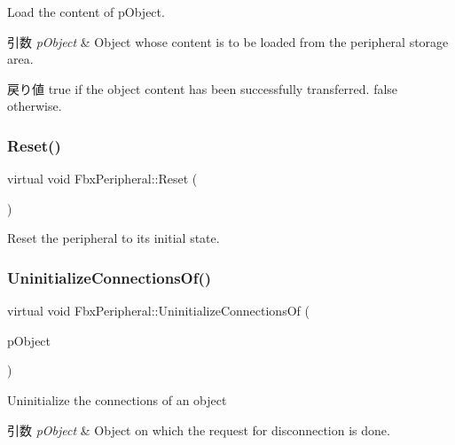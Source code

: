 Load the content of p\+Object. 
\begin{DoxyParams}{引数}
{\em p\+Object} & Object whose content is to be loaded from the peripheral storage area. \\
\hline
\end{DoxyParams}
\begin{DoxyReturn}{戻り値}
{\ttfamily true} if the object content has been successfully transferred. {\ttfamily false} otherwise. 
\end{DoxyReturn}
\mbox{\label{class_fbx_peripheral_abda49f57236244f342a37d3fb04b476b}} 
\subsubsection{\texorpdfstring{Reset()}{Reset()}}
{\footnotesize\ttfamily virtual void Fbx\+Peripheral\+::\+Reset (\begin{DoxyParamCaption}{ }\end{DoxyParamCaption})\hspace{0.3cm}{\ttfamily [pure virtual]}}

Reset the peripheral to its initial state. \mbox{\label{class_fbx_peripheral_ae7cd11b61456cfa33644ebf37870779c}} 
\subsubsection{\texorpdfstring{Uninitialize\+Connections\+Of()}{UninitializeConnectionsOf()}}
{\footnotesize\ttfamily virtual void Fbx\+Peripheral\+::\+Uninitialize\+Connections\+Of (\begin{DoxyParamCaption}\item[{\hyperlink{class_fbx_object}{Fbx\+Object} $\ast$}]{p\+Object }\end{DoxyParamCaption})\hspace{0.3cm}{\ttfamily [pure virtual]}}

Uninitialize the connections of an object 
\begin{DoxyParams}{引数}
{\em p\+Object} & Object on which the request for disconnection is done. \\
\hline
\end{DoxyParams}
\mbox{\label{class_fbx_peripheral_a3ab3dba37ee2b8a4215229f9d11325b7}} 
